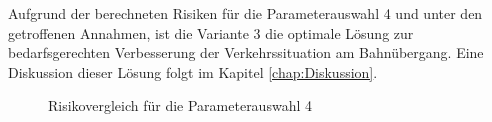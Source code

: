 Aufgrund der berechneten Risiken für die Parameterauswahl 4 und unter den getroffenen Annahmen, ist die Variante 3 die optimale Lösung zur bedarfsgerechten Verbesserung der Verkehrssituation am Bahnübergang. Eine Diskussion dieser Lösung folgt im Kapitel \ref{chap:Diskussion}.

\begin{figure}[h!]
  \centering
  \hfill
\caption[Risikovergleich Parameterauswahl 4]{Risikovergleich für die Parameterauswahl 4}
  \label{fig:Parameter4}
\end{figure}



%

